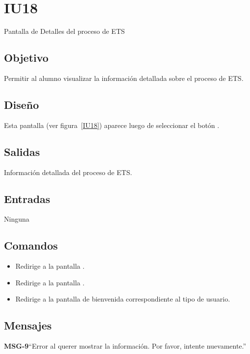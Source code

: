 \section{IU18} {Pantalla de Detalles del proceso de ETS}

\subsection{Objetivo}
Permitir al alumno visualizar la información detallada sobre el proceso de ETS.

\subsection{Diseño}
Esta pantalla  (ver figura~\ref{IU18}) aparece luego de seleccionar el botón . 


\subsection{Salidas}

Información detallada del proceso de ETS. 

\subsection{Entradas}
Ninguna


\subsection{Comandos}
\begin{itemize}
	\item {} Redirige a la pantalla .
	\item {} Redirige a la pantalla .
	\item {} Redirige a la pantalla de bienvenida correspondiente al tipo de usuario.
\end{itemize}
\subsection{Mensajes}

\begin{Citemize}
	\item {\bf MSG-9}{``Error al querer mostrar la información. Por favor, intente nuevamente.''}
\end{Citemize}

